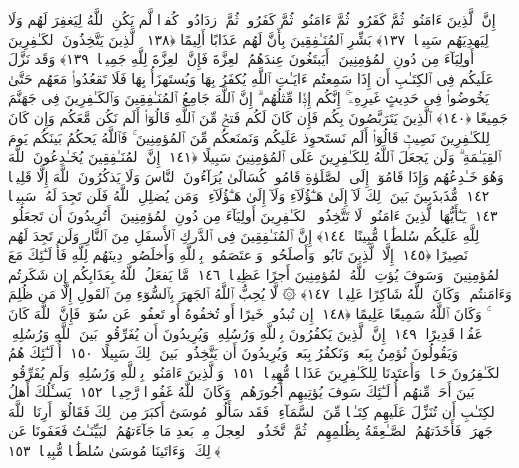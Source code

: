  إِنَّ ٱلَّذِينَ ءَامَنُوا۟ ثُمَّ كَفَرُوا۟ ثُمَّ ءَامَنُوا۟ ثُمَّ كَفَرُوا۟ ثُمَّ ٱزدَادُوا۟ كُفرًۭا لَّم يَكُنِ ٱللَّهُ لِيَغفِرَ لَهُم وَلَا لِيَهدِيَهُم سَبِيلًۢا ﴿١٣٧﴾
 بَشِّرِ ٱلمُنَـٰفِقِينَ بِأَنَّ لَهُم عَذَابًا أَلِيمًا ﴿١٣٨﴾
 ٱلَّذِينَ يَتَّخِذُونَ ٱلكَـٰفِرِينَ أَولِيَآءَ مِن دُونِ ٱلمُؤمِنِينَ ۚ أَيَبتَغُونَ عِندَهُمُ ٱلعِزَّةَ فَإِنَّ ٱلعِزَّةَ لِلَّهِ جَمِيعًۭا ﴿١٣٩﴾
 وَقَد نَزَّلَ عَلَيكُم فِى ٱلكِتَـٰبِ أَن إِذَا سَمِعتُم ءَايَـٰتِ ٱللَّهِ يُكفَرُ بِهَا وَيُستَهزَأُ بِهَا فَلَا تَقعُدُوا۟ مَعَهُم حَتَّىٰ يَخُوضُوا۟ فِى حَدِيثٍ غَيرِهِۦٓ ۚ إِنَّكُم إِذًۭا مِّثلُهُم ۗ إِنَّ ٱللَّهَ جَامِعُ ٱلمُنَـٰفِقِينَ وَٱلكَـٰفِرِينَ فِى جَهَنَّمَ جَمِيعًا ﴿١٤٠﴾
 ٱلَّذِينَ يَتَرَبَّصُونَ بِكُم فَإِن كَانَ لَكُم فَتحٌۭ مِّنَ ٱللَّهِ قَالُوٓا۟ أَلَم نَكُن مَّعَكُم وَإِن كَانَ لِلكَـٰفِرِينَ نَصِيبٌۭ قَالُوٓا۟ أَلَم نَستَحوِذ عَلَيكُم وَنَمنَعكُم مِّنَ ٱلمُؤمِنِينَ ۚ فَٱللَّهُ يَحكُمُ بَينَكُم يَومَ ٱلقِيَـٰمَةِ ۗ وَلَن يَجعَلَ ٱللَّهُ لِلكَـٰفِرِينَ عَلَى ٱلمُؤمِنِينَ سَبِيلًا ﴿١٤١﴾
 إِنَّ ٱلمُنَـٰفِقِينَ يُخَـٰدِعُونَ ٱللَّهَ وَهُوَ خَـٰدِعُهُم وَإِذَا قَامُوٓا۟ إِلَى ٱلصَّلَوٰةِ قَامُوا۟ كُسَالَىٰ يُرَآءُونَ ٱلنَّاسَ وَلَا يَذكُرُونَ ٱللَّهَ إِلَّا قَلِيلًۭا ﴿١٤٢﴾
 مُّذَبذَبِينَ بَينَ ذَٟلِكَ لَآ إِلَىٰ هَـٰٓؤُلَآءِ وَلَآ إِلَىٰ هَـٰٓؤُلَآءِ ۚ وَمَن يُضلِلِ ٱللَّهُ فَلَن تَجِدَ لَهُۥ سَبِيلًۭا ﴿١٤٣﴾
 يَـٰٓأَيُّهَا ٱلَّذِينَ ءَامَنُوا۟ لَا تَتَّخِذُوا۟ ٱلكَـٰفِرِينَ أَولِيَآءَ مِن دُونِ ٱلمُؤمِنِينَ ۚ أَتُرِيدُونَ أَن تَجعَلُوا۟ لِلَّهِ عَلَيكُم سُلطَٰنًۭا مُّبِينًا ﴿١٤٤﴾
 إِنَّ ٱلمُنَـٰفِقِينَ فِى ٱلدَّركِ ٱلأَسفَلِ مِنَ ٱلنَّارِ وَلَن تَجِدَ لَهُم نَصِيرًا ﴿١٤٥﴾
 إِلَّا ٱلَّذِينَ تَابُوا۟ وَأَصلَحُوا۟ وَٱعتَصَمُوا۟ بِٱللَّهِ وَأَخلَصُوا۟ دِينَهُم لِلَّهِ فَأُو۟لَـٰٓئِكَ مَعَ ٱلمُؤمِنِينَ ۖ وَسَوفَ يُؤتِ ٱللَّهُ ٱلمُؤمِنِينَ أَجرًا عَظِيمًۭا ﴿١٤٦﴾
 مَّا يَفعَلُ ٱللَّهُ بِعَذَابِكُم إِن شَكَرتُم وَءَامَنتُم ۚ وَكَانَ ٱللَّهُ شَاكِرًا عَلِيمًۭا ﴿١٤٧﴾
 ۞ لَّا يُحِبُّ ٱللَّهُ ٱلجَهرَ بِٱلسُّوٓءِ مِنَ ٱلقَولِ إِلَّا مَن ظُلِمَ ۚ وَكَانَ ٱللَّهُ سَمِيعًا عَلِيمًا ﴿١٤٨﴾
 إِن تُبدُوا۟ خَيرًا أَو تُخفُوهُ أَو تَعفُوا۟ عَن سُوٓءٍۢ فَإِنَّ ٱللَّهَ كَانَ عَفُوًّۭا قَدِيرًا ﴿١٤٩﴾
 إِنَّ ٱلَّذِينَ يَكفُرُونَ بِٱللَّهِ وَرُسُلِهِۦ وَيُرِيدُونَ أَن يُفَرِّقُوا۟ بَينَ ٱللَّهِ وَرُسُلِهِۦ وَيَقُولُونَ نُؤمِنُ بِبَعضٍۢ وَنَكفُرُ بِبَعضٍۢ وَيُرِيدُونَ أَن يَتَّخِذُوا۟ بَينَ ذَٟلِكَ سَبِيلًا ﴿١٥٠﴾
 أُو۟لَـٰٓئِكَ هُمُ ٱلكَـٰفِرُونَ حَقًّۭا ۚ وَأَعتَدنَا لِلكَـٰفِرِينَ عَذَابًۭا مُّهِينًۭا ﴿١٥١﴾
 وَٱلَّذِينَ ءَامَنُوا۟ بِٱللَّهِ وَرُسُلِهِۦ وَلَم يُفَرِّقُوا۟ بَينَ أَحَدٍۢ مِّنهُم أُو۟لَـٰٓئِكَ سَوفَ يُؤتِيهِم أُجُورَهُم ۗ وَكَانَ ٱللَّهُ غَفُورًۭا رَّحِيمًۭا ﴿١٥٢﴾
 يَسـَٔلُكَ أَهلُ ٱلكِتَـٰبِ أَن تُنَزِّلَ عَلَيهِم كِتَـٰبًۭا مِّنَ ٱلسَّمَآءِ ۚ فَقَد سَأَلُوا۟ مُوسَىٰٓ أَكبَرَ مِن ذَٟلِكَ فَقَالُوٓا۟ أَرِنَا ٱللَّهَ جَهرَةًۭ فَأَخَذَتهُمُ ٱلصَّـٰعِقَةُ بِظُلمِهِم ۚ ثُمَّ ٱتَّخَذُوا۟ ٱلعِجلَ مِنۢ بَعدِ مَا جَآءَتهُمُ ٱلبَيِّنَـٰتُ فَعَفَونَا عَن ذَٟلِكَ ۚ وَءَاتَينَا مُوسَىٰ سُلطَٰنًۭا مُّبِينًۭا ﴿١٥٣﴾

